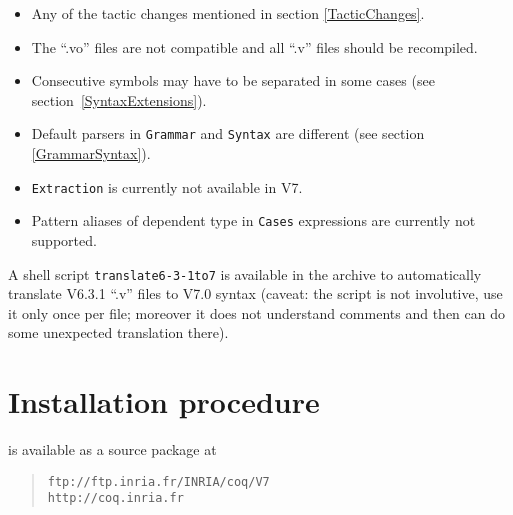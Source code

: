 \documentclass[11pt]{article}
\begin{document}
  \begin{itemize}
 
  \item Any of the tactic changes mentioned in section \ref{TacticChanges}.

  \item The ``.vo'' files are not compatible and all ``.v'' files should
  be recompiled.

  \item Consecutive symbols may have to be separated in some cases (see
  section~\ref{SyntaxExtensions}).

  \item Default parsers in {\tt Grammar} and {\tt Syntax} are
  different (see section \ref{GrammarSyntax}).

  \item {\tt Extraction} is currently not available in {\Coq} V7.

  \item Pattern aliases of dependent type in \verb=Cases=
  expressions are currently not supported.

  \end{itemize}

A shell script \verb=translate6-3-1to7= is available in the archive to
automatically translate V6.3.1 ``.v'' files to V7.0 syntax (caveat:
the script is not involutive, use it only once per file; moreover it
does not understand comments and then can do some unexpected
translation there).


\section{Installation procedure}


{\Coq} is available as a source package at 

\begin{quote}
\verb|ftp://ftp.inria.fr/INRIA/coq/V7|\\
\verb|http://coq.inria.fr|
\end{quote}
\end{document}
